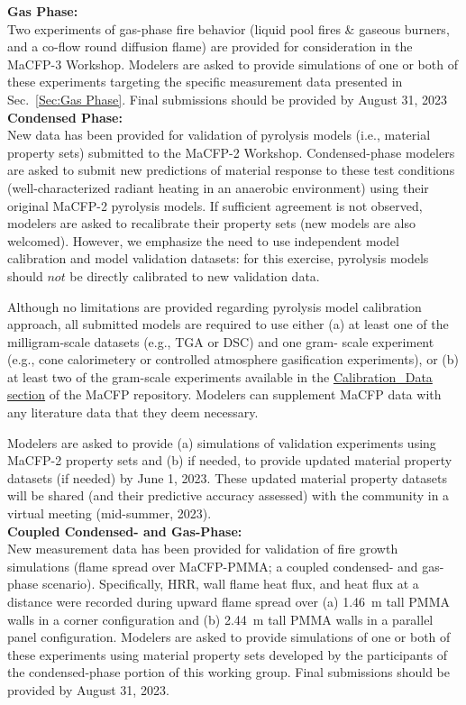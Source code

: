 \documentclass[12pt]{article}
\begin{document}
\textbf{Gas Phase:}\\
Two experiments of gas-phase fire behavior (liquid pool fires \& gaseous burners, and a co-flow round diffusion flame) are provided for consideration in the MaCFP-3 Workshop. Modelers are asked to provide simulations of one or both of these experiments targeting the specific measurement data presented in Sec.~\ref{Sec:Gas Phase}. Final submissions should be provided by August 31, 2023\\

\textbf{Condensed Phase:}\\
New data has been provided for validation of pyrolysis models (i.e., material property sets) submitted to the MaCFP-2 Workshop. Condensed-phase modelers are asked to submit new predictions of material response to these test conditions (well-characterized radiant heating in an anaerobic environment) using their original MaCFP-2 pyrolysis models. If sufficient agreement is not observed, modelers are asked to recalibrate their property sets (new models are also welcomed). However, we emphasize the need to use independent model calibration and model validation datasets: for this exercise, pyrolysis models should $not$ be directly calibrated to new validation data.  

Although no limitations are provided regarding pyrolysis model calibration approach, all submitted models are required to use either (a) at least one of the milligram-scale datasets (e.g., TGA or DSC) and one gram- scale experiment (e.g., cone calorimetery or controlled atmosphere gasification experiments), or (b) at least two of the gram-scale experiments available in the \href{https://github.com/MaCFP/matl-db/tree/master/PMMA/Calibration_Data}{Calibration\_Data section} of the MaCFP repository. Modelers can supplement MaCFP data with any literature data that they deem necessary. 

Modelers are asked to provide (a) simulations of validation experiments using MaCFP-2 property sets and (b) if needed, to provide updated material property datasets (if needed) by June 1, 2023. These updated material property datasets will be shared (and their predictive accuracy assessed) with the community in a virtual meeting (mid-summer, 2023).\\

\textbf{Coupled Condensed- and Gas-Phase:}\\
New measurement data has been provided for validation of fire growth simulations (flame spread over MaCFP-PMMA; a coupled condensed- and gas-phase scenario). Specifically, HRR, wall flame heat flux, and heat flux at a distance were recorded during upward flame spread over (a) 1.46~m tall PMMA walls in a corner configuration and (b) 2.44~m tall PMMA walls in a parallel panel configuration.
Modelers are asked to provide simulations of one or both of these experiments using material property sets developed by the participants of the condensed-phase portion of this working group. Final submissions should be provided by August 31, 2023. 
\end{document}
